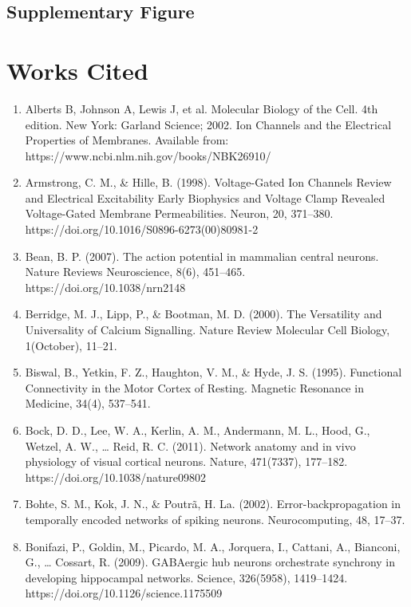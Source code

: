 \documentclass[11pt,titlepage]{article}
\begin{document}
\subsection{Supplementary Figure}

\clearpage
\section{Works Cited}
%
%
\begin{spacing}{1}
\begin{enumerate}
\item Alberts B, Johnson A, Lewis J, et al. Molecular Biology of the Cell. 4th edition. New York: Garland Science; 2002. Ion Channels and the Electrical Properties of Membranes. Available from: https://www.ncbi.nlm.nih.gov/books/NBK26910/
\item Armstrong, C. M., \& Hille, B. (1998). Voltage-Gated Ion Channels Review and Electrical Excitability Early Biophysics and Voltage Clamp Revealed Voltage-Gated Membrane Permeabilities. Neuron, 20, 371–380.\\ https://doi.org/10.1016/S0896-6273(00)80981-2
\item Bean, B. P. (2007). The action potential in mammalian central neurons. Nature Reviews Neuroscience, 8(6), 451–465. https://doi.org/10.1038/nrn2148
\item Berridge, M. J., Lipp, P., \& Bootman, M. D. (2000). The Versatility and Universality of Calcium Signalling. Nature Review Molecular Cell Biology, 1(October), 11–21.
\item Biswal, B., Yetkin, F. Z., Haughton, V. M., \& Hyde, J. S. (1995). Functional Connectivity in the Motor Cortex of Resting. Magnetic Resonance in Medicine, 34(4), 537–541.
\item Bock, D. D., Lee, W. A., Kerlin, A. M., Andermann, M. L., Hood, G., Wetzel, A. W., … Reid, R. C. (2011). Network anatomy and in vivo physiology of visual cortical neurons. Nature, 471(7337), 177–182. https://doi.org/10.1038/nature09802
\item Bohte, S. M., Kok, J. N., \& Poutrã, H. La. (2002). Error-backpropagation in temporally encoded networks of spiking neurons. Neurocomputing, 48, 17–37.
\item Bonifazi, P., Goldin, M., Picardo, M. A., Jorquera, I., Cattani, A., Bianconi, G., … Cossart, R. (2009). GABAergic hub neurons orchestrate synchrony in developing hippocampal networks. Science, 326(5958), 1419–1424. https://doi.org/10.1126/science.1175509

\end{enumerate}
\end{spacing}
\end{document}

